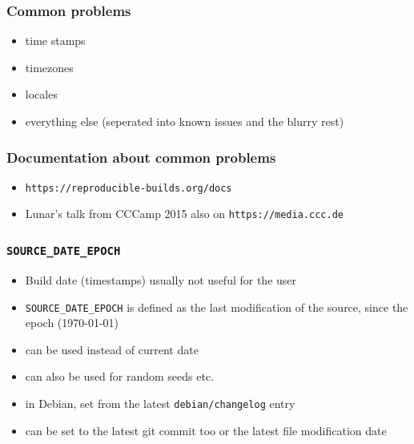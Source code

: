 \documentclass[14pt,aspectratio=169]{beamer}
\begin{document}
\begin{frame}
 \frametitle{Common problems}

 \begin{itemize}
  \item time stamps
  \item timezones
  \item locales
  \item everything else (seperated into known issues and the blurry rest)
 \end{itemize}
\end{frame}

\begin{frame}
 \frametitle{Documentation about common problems}
 \begin{itemize}
  \item \texttt{https://reproducible-builds.org/docs}
  \item Lunar's talk from CCCamp 2015 also on
  \texttt{https://media.ccc.de}
 \end{itemize}
\end{frame}


\begin{frame}
 \frametitle{\texttt{SOURCE\_DATE\_EPOCH}}

 \begin{itemize}
  \item Build date (timestamps) usually not useful for the user
  \item \texttt{SOURCE\_DATE\_EPOCH} is defined as the last modification of
  the source, since the epoch (1970-01-01)
  \item can be used instead of current date
  \item can also be used for random seeds etc.
  \item in Debian, set from the latest \texttt{debian/changelog} entry
  \item can be set to the latest git commit too or the latest file
  modification date
 \end{itemize}
\end{frame}
\end{document}
